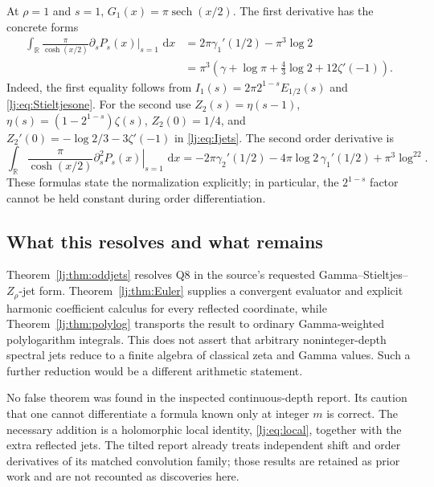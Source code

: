 \documentclass[11pt,a4paper]{article}
\numberwithin{equation}{section}
\theoremstyle{definition}
\theoremstyle{remark}
\newcommand{\dd}{\,\mathrm d}
\begin{document}
At $\rho=1$ and $s=1$, $G_1(x)=\pi\operatorname{sech}(x/2)$.
The first derivative has the concrete forms
\begin{align}
 \int_{\mathbb R}\frac{\pi}{\cosh(x/2)}
       \left.\partial_sP_s(x)\right|_{s=1}\,\dd x
 &=2\pi\gamma_1'(1/2)-\pi^3\log2
 \label{lj:eq:exampleStieltjes}\\
 &=\pi^3\left(\gamma+\log\pi+
                  \frac43\log2+12\zeta'(-1)\right).
 \label{lj:eq:exampleZeta}
\end{align}
Indeed, the first equality follows from
$I_1(s)=2\pi2^{1-s}E_{1/2}(s)$ and
\eqref{lj:eq:Stieltjesone}. For the second use
$Z_2(s)=\eta(s-1)$,
$\eta(s)=(1-2^{1-s})\zeta(s)$,
$Z_2(0)=1/4$, and
$Z_2'(0)=-\log2/3-3\zeta'(-1)$ in
\eqref{lj:eq:Ijets}. The second order derivative is
\begin{equation}
 \int_{\mathbb R}\frac{\pi}{\cosh(x/2)}
       \left.\partial_s^2P_s(x)\right|_{s=1}\,\dd x
 =-2\pi\gamma_2'(1/2)-4\pi\log2\,\gamma_1'(1/2)
       +\pi^3\log^22.
 \label{lj:eq:exampleSecond}
\end{equation}
These formulas state the normalization explicitly; in particular, the
$2^{1-s}$ factor cannot be held constant during order differentiation.

\subsection{What this resolves and what remains}

Theorem~\ref{lj:thm:oddjets} resolves Q8 in the source's requested
Gamma--Stieltjes--$Z_\rho$-jet form. Theorem~\ref{lj:thm:Euler} supplies
a convergent evaluator and explicit harmonic coefficient calculus for
every reflected coordinate, while Theorem~\ref{lj:thm:polylog} transports
the result to ordinary Gamma-weighted polylogarithm integrals. This does
not assert that arbitrary noninteger-depth spectral jets reduce to a
finite algebra of classical zeta and Gamma values. Such a further
reduction would be a different arithmetic statement.

No false theorem was found in the inspected continuous-depth report.
Its caution that one cannot differentiate a formula known only at
integer $m$ is correct. The necessary addition is a holomorphic local
identity, \eqref{lj:eq:local}, together with the extra reflected jets.
The tilted report already treats independent shift and order derivatives
of its matched convolution family; those results are retained as prior
work and are not recounted as discoveries here.
\end{document}
